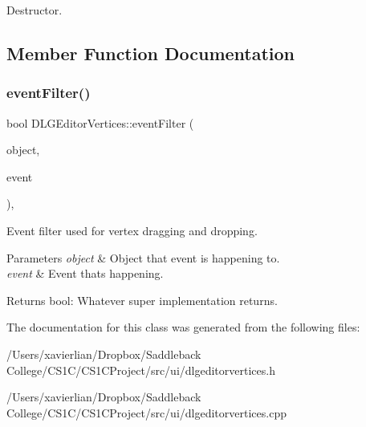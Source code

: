 Destructor. 



\subsection{Member Function Documentation}
\mbox{\label{class_d_l_g_editor_vertices_a2e6c698e2749d8c3a2dedcdcf95a1c79}} 
\subsubsection{\texorpdfstring{eventFilter()}{eventFilter()}}
{\footnotesize\ttfamily bool D\+L\+G\+Editor\+Vertices\+::event\+Filter (\begin{DoxyParamCaption}\item[{Q\+Object $\ast$}]{object,  }\item[{Q\+Event $\ast$}]{event }\end{DoxyParamCaption})\hspace{0.3cm}{\ttfamily [override]}, {\ttfamily [protected]}}



Event filter used for vertex dragging and dropping. 


\begin{DoxyParams}{Parameters}
{\em object} & Object that event is happening to. \\
\hline
{\em event} & Event that\textquotesingle{}s happening. \\
\hline
\end{DoxyParams}
\begin{DoxyReturn}{Returns}
bool\+: Whatever super implementation returns. 
\end{DoxyReturn}


The documentation for this class was generated from the following files\+:\begin{DoxyCompactItemize}
\item 
/\+Users/xavierlian/\+Dropbox/\+Saddleback College/\+C\+S1\+C/\+C\+S1\+C\+Project/src/ui/dlgeditorvertices.\+h\item 
/\+Users/xavierlian/\+Dropbox/\+Saddleback College/\+C\+S1\+C/\+C\+S1\+C\+Project/src/ui/dlgeditorvertices.\+cpp\end{DoxyCompactItemize}
